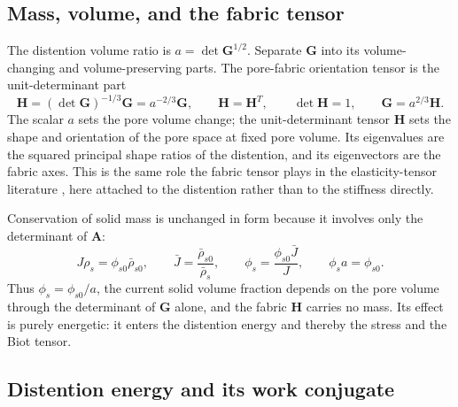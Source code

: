 \subsection{Mass, volume, and the fabric tensor}
\label{sec:fabric-mass}

The distention volume ratio is \(a=\det\mathbf G^{1/2}\). Separate
\(\mathbf G\) into its volume-changing and volume-preserving parts. The
pore-fabric orientation tensor is the unit-determinant part
\begin{equation}
 \mathbf H=(\det\mathbf G)^{-1/3}\mathbf G
          =a^{-2/3}\mathbf G,\qquad
 \mathbf H=\mathbf H^T,\qquad \det\mathbf H=1,\qquad
 \mathbf G=a^{2/3}\mathbf H.
 \label{eq:fabric-tensor}
\end{equation}
The scalar \(a\) sets the pore volume change; the unit-determinant tensor
\(\mathbf H\) sets the shape and orientation of the pore space at fixed
pore volume. Its eigenvalues are the squared principal shape ratios of the
distention, and its eigenvectors are the fabric axes. This is the same role the
fabric tensor plays in the elasticity-tensor literature
\citep{cowin1985fabric,turnercowin1987,moesencardosocowin2012}, here
attached to the distention rather than to the stiffness directly.

Conservation of solid mass is unchanged in form because it involves only
the determinant of \(\mathbf A\):
\begin{equation}
 J\rho_s=\phi_{s0}\bar\rho_{s0},\qquad
 \bar J=\frac{\bar\rho_{s0}}{\bar\rho_s},\qquad
 \phi_s=\frac{\phi_{s0}\bar J}{J},\qquad
 \phi_s a=\phi_{s0}.
 \label{eq:fabric-solid-mass}
\end{equation}
Thus \(\phi_s=\phi_{s0}/a\), the current solid volume fraction depends on
the pore volume through the determinant of \(\mathbf G\) alone, and the
fabric \(\mathbf H\) carries no mass. Its effect is purely energetic: it
enters the distention energy and thereby the stress and the Biot
tensor.

\subsection{Distention energy and its work conjugate}
\label{sec:fabric-energy}


